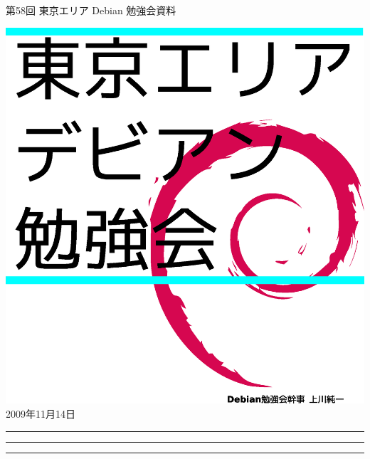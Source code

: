 \documentclass[mingoth,a4paper]{jsarticle}
\newcommand{\debmtgyear}{2009}
\newcommand{\debmtgmonth}{11}
\newcommand{\debmtgdate}{14}
\newcommand{\debmtgnumber}{58}
\begin{document}
\begin{titlepage}
\thispagestyle{empty}


\vspace*{-2cm}
第\debmtgnumber{}回 東京エリア Debian 勉強会資料

\hspace*{-2.4cm}
\includegraphics[width=210mm]{image200801/2008title.eps}\\
\hfill{}\debmtgyear{}年\debmtgmonth{}月\debmtgdate{}日

\end{titlepage}


\newpage\mbox{}\newpage

\begin{minipage}[b]{0.2\hsize}
 \colorbox{titleback}{}
\end{minipage}
\begin{minipage}[b]{0.8\hsize}
\hrule
\vspace{2mm}
\hrule

\setcounter{tocdepth}{1}
\tableofcontents
\vspace{2mm}
\hrule
\end{minipage}
\end{document}
